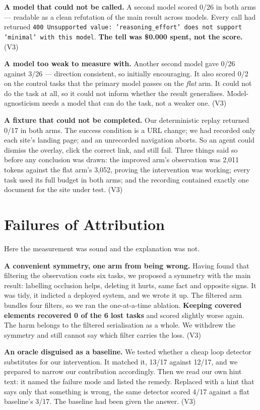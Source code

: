 \documentclass[conference]{IEEEtran}
\begin{document}
\textbf{A model that could not be called.} A second model scored 0/26 in both
arms --- readable as a clean refutation of the main result across models. Every
call had returned \texttt{400 Unsupported value: 'reasoning\_effort' does not
support 'minimal' with this model}. \textbf{The tell was \$0.000 spent, not the
score.} (V3)

\textbf{A model too weak to measure with.} Another second model gave 0/26
against 3/26 --- direction consistent, so initially encouraging. It also scored
0/2 on the control tasks that the primary model passes on the \emph{flat} arm.
It could not do the task at all, so it could not inform whether the result
generalises. Model-agnosticism needs a model that can do the task, not a weaker
one. (V3)

\textbf{A fixture that could not be completed.} Our deterministic replay
returned 0/17 in both arms. The success condition is a URL change; we had
recorded only each site's landing page; and an unrecorded navigation aborts. So
an agent could dismiss the overlay, click the correct link, and still fail.
Three things said so before any conclusion was drawn: the improved arm's
observation was 2{,}011 tokens against the flat arm's 3{,}052, proving the
intervention was working; every task used its full budget in both arms; and the
recording contained exactly one document for the site under test. (V3)

\section{Failures of Attribution}

Here the measurement was sound and the explanation was not.

\textbf{A convenient symmetry, one arm from being wrong.} Having found that
filtering the observation costs six tasks, we proposed a symmetry with the main
result: labelling occlusion helps, deleting it hurts, same fact and opposite
signs. It was tidy, it indicted a deployed system, and we wrote it up. The
filtered arm bundles four filters, so we ran the one-at-a-time ablation.
\textbf{Keeping covered elements recovered 0 of the 6 lost tasks} and scored
slightly worse again. The harm belongs to the filtered serialisation as a
whole. We withdrew the symmetry and still cannot say which filter carries the
loss. (V3)

\textbf{An oracle disguised as a baseline.} We tested whether a cheap loop
detector substitutes for our intervention. It matched it, 13/17 against 12/17,
and we prepared to narrow our contribution accordingly. Then we read our own
hint text: it named the failure mode and listed the remedy. Replaced with a
hint that says only that something is wrong, the same detector scored 4/17
against a flat baseline's 3/17. The baseline had been given the answer. (V3)
\end{document}
